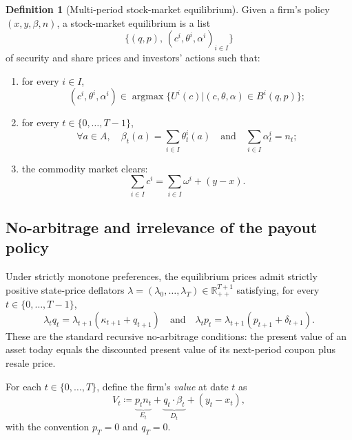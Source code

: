 \documentclass[11pt,a4paper,oneside]{book}
\def\R{\mathbb{R}}
\def\et{\quad \text{and} \quad}
\DeclareMathOperator*{\argmax}{argmax}
\theoremstyle{plain}
\theoremstyle{definition}
\newtheorem{definition}[theorem]{Definition}
\theoremstyle{remark}
\numberwithin{equation}{chapter}
\begin{document}
\begin{definition}[Multi-period stock-market equilibrium]\label{def:eq-multiperiod}
Given a firm's policy $(x, y, \beta, n)$, a stock-market equilibrium is a list
\begin{equation*}
  \bigl\{ (q, p), \, (c^i, \theta^i, \alpha^i)_{i \in I} \bigr\}
\end{equation*}
of security and share prices and investors' actions such that:
\begin{enumerate}
  \item[(a)] for every $i \in I$,
  \begin{equation*}
    (c^i, \theta^i, \alpha^i) \in \argmax \bigl\{ U^i(c) \vert (c, \theta, \alpha) \in B^i(q, p) \bigr\};
  \end{equation*}
  \item[(b)] for every $t \in \{0, \ldots, T-1\}$,
  \begin{equation*}
    \forall a \in A, \quad \beta_t(a) = \sum_{i \in I} \theta^i_t(a)
    \et
    \sum_{i \in I} \alpha^i_t = n_t;
  \end{equation*}
  \item[(c)] the commodity market clears:
  \begin{equation*}
    \sum_{i \in I} c^i = \sum_{i \in I} \omega^i + (y - x).
  \end{equation*}
\end{enumerate}
\end{definition}

\subsection{No-arbitrage and irrelevance of the payout policy}

Under strictly monotone preferences, the equilibrium prices admit strictly positive state-price deflators $\lambda = (\lambda_0, \ldots, \lambda_T) \in \R_{++}^{T+1}$ satisfying, for every $t \in \{0, \ldots, T-1\}$,
\begin{equation}\label{eq:no-arb-MP}
  \lambda_t q_t = \lambda_{t+1} (\kappa_{t+1} + q_{t+1})
  \et
  \lambda_t p_t = \lambda_{t+1} (p_{t+1} + \delta_{t+1}).
\end{equation}
These are the standard recursive no-arbitrage conditions: the present value of an asset today equals the discounted present value of its next-period coupon plus resale price.

For each $t \in \{0, \ldots, T\}$, define the firm's \emph{value} at date $t$ as
\begin{equation}\label{eq:firm-value-MP}
  V_t \coloneqq \underbrace{p_t n_t}_{E_t} + \underbrace{q_t \cdot \beta_t}_{D_t} + (y_t - x_t),
\end{equation}
with the convention $p_T = 0$ and $q_T = 0$.
\end{document}
